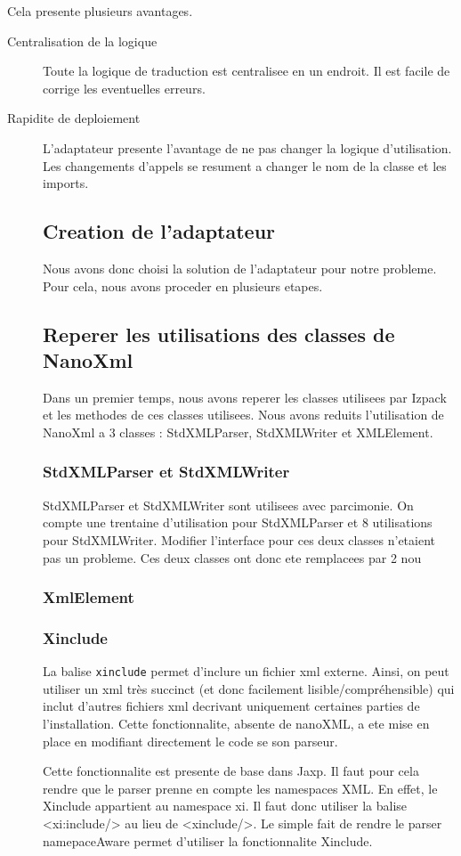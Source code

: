 Cela presente plusieurs avantages.
\begin{description}
\item[Centralisation de la logique] Toute la logique de traduction est centralisee en un endroit. Il est facile de corrige les eventuelles erreurs.
\item[Rapidite de deploiement] L'adaptateur presente l'avantage de ne pas changer la logique d'utilisation. Les changements d'appels se resument a changer le nom de la classe et les imports.
\subsection{Creation de l'adaptateur}
Nous avons donc choisi la solution de l'adaptateur pour notre probleme. Pour cela, nous avons proceder en plusieurs etapes.
\subsection{Reperer les utilisations des classes de NanoXml}
Dans un premier temps, nous avons reperer les classes utilisees par Izpack et les methodes de ces classes utilisees. Nous avons reduits l'utilisation de NanoXml a 3 classes : StdXMLParser, StdXMLWriter et XMLElement. 
\subsubsection{StdXMLParser et StdXMLWriter}
StdXMLParser et StdXMLWriter sont utilisees avec parcimonie. On compte une trentaine d'utilisation pour StdXMLParser et 8 utilisations pour StdXMLWriter. Modifier l'interface pour ces deux classes n'etaient pas un probleme. Ces deux classes ont donc ete remplacees par 2 nou
\subsubsection{XmlElement}
\subsubsection{Xinclude}
La balise \verb|xinclude| permet d'inclure un fichier xml externe. Ainsi, on peut utiliser un xml très succinct (et donc facilement lisible/compréhensible) qui inclut d'autres fichiers xml decrivant uniquement certaines parties de l'installation. Cette fonctionnalite, absente de nanoXML, a ete mise en place en modifiant directement le code se son parseur.

Cette fonctionnalite est presente de base dans Jaxp. Il faut pour cela rendre que le parser prenne en compte les namespaces XML. En effet, le Xinclude appartient au namespace xi. Il faut donc utiliser la balise <xi:include/> au lieu de <xinclude/>. Le simple fait de rendre le parser namepaceAware permet d'utiliser la fonctionnalite Xinclude. 


\end{description}
